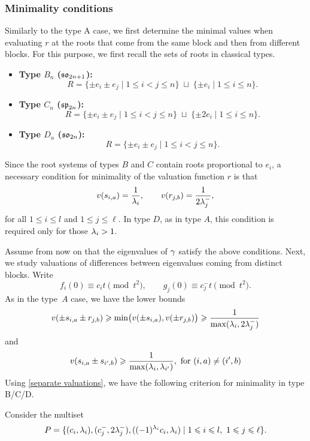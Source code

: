 \documentclass[11pt]{article}
\numberwithin{equation}{section}
\begin{document}
\subsubsection{Minimality conditions}
Similarly to the type A case, we first determine the minimal values when evaluating $r$ at the roots that come from the same block and then from different blocks. For this purpose, we first recall the sets of roots in classical types. 
\begin{itemize}
\item \textbf{Type $B_n$ ($\mathfrak{so}_{2n+1}$):}
\[
R=\{\pm e_i \pm e_j \mid 1\le i<j\le n\}\;\sqcup\;\{\pm e_i \mid 1\le i\le n\}.
\]

\item \textbf{Type $C_n$ ($\mathfrak{sp}_{2n}$):}
\[
R=\{\pm e_i \pm e_j \mid 1\le i<j\le n\}\;\sqcup\;\{\pm 2e_i \mid 1\le i\le n\}.
\]

\item \textbf{Type $D_n$ ($\mathfrak{so}_{2n}$):}
\[
R=\{\pm e_i \pm e_j \mid 1\le i<j\le n\}.
\]
\end{itemize}


Since the root systems of types $B$ and $C$ contain roots proportional to $e_i$,
a necessary condition for minimality of the valuation function $r$ is that
\[
v(s_{i,a})=\frac{1}{\lambda_i},
\qquad
v(r_{j,b})=\frac{1}{2\lambda^-_j},
\]
for all $1\le i\le l$ and $1\le j\le \ell$.
In type $D$, as in type $A$, this condition is required only for those
$\lambda_i> 1$. 

Assume from now on that the eigenvalues of $\gamma$ satisfy the above conditions. Next, we study valuations of differences between eigenvalues coming from distinct
blocks.
Write
\[
f_i(0) \equiv c_it \pmod {t^2},
\qquad
g_j(0) \equiv c^-_jt \pmod {t^2}.
\]
As in the type~$A$ case, we have the lower bounds
\begin{equation}\label{cross pn}
    v(\pm s_{i,a}\pm r_{j,b})
\geqslant
\min\bigl(v(\pm s_{i,a}),v(\pm r_{j,b})\bigr)
\geqslant
\frac{1}{\max(\lambda_i,2\lambda^-_j)}
\end{equation}
and
\begin{equation}\label{positive cycle bound}
    v(s_{i,a} \pm s_{i',b})
\geqslant
\frac{1}{\max(\lambda_i,\lambda_{i'})}, \text{ for } (i,a)\neq(i',b)
\end{equation}
Using \cref{separate valuations}, we have the following criterion for minimality in type B/C/D.

Consider the multiset
\[
P= \{(c_i,\la_i), (c^-_j,2\la^-_j), ((-1)^{\la_i}c_i,\la_i)\mid 1\leqslant i\leqslant l,\ 1\leqslant j\leqslant \ell\}.
\]
\end{document}
